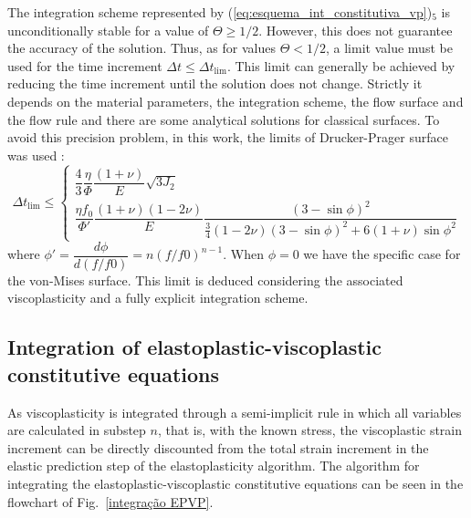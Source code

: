 \documentclass[Journal,letterpaper]{ascelike-new}
\begin{document}
The integration scheme represented by (\ref{eq:esquema_int_constitutiva_vp})$_5$ is unconditionally stable for a value of $\Theta \geq 1/2$. However, this does not guarantee the accuracy of the solution. Thus, as for values $\Theta < 1/2$, a limit value must be used for the time increment $\Delta t \leq \Delta t_{\text{lim}}$. This limit can generally be achieved by reducing the time increment until the solution does not change. Strictly it depends on the material parameters, the integration scheme, the flow surface and the flow rule and there are some analytical solutions for classical surfaces. To avoid this precision problem, in this work, the limits of Drucker-Prager surface was used \cite{cormeau1975}:
\begin{equation}
	\label{eq:deltatmin_dp}
	\Delta t_{\text{lim}} \leq \left\{ 
	\begin{array}{lcl} 
		\dfrac{4}{3}\dfrac{\eta}{\Phi}\dfrac{(1+\nu)}{E} {\sqrt{3J_2}} \\
		\dfrac{\eta f_0}{\Phi'}\dfrac{(1+\nu)(1-2\nu)}{E}\dfrac{(3-\sin{\phi})^2}{\frac{3}{4}(1-2\nu)(3-\sin{\phi})^2 + 6(1+\nu)\sin{\phi}^2}
	\end{array} \right.
\end{equation}
where $\phi'= \dfrac{d \phi}{d(f/f0)} = n(f/f0)^{n-1}$. When $\phi = 0$ we have the specific case for the von-Mises surface. This limit is deduced considering the associated viscoplasticity and a fully explicit integration scheme. 

\subsection{Integration of elastoplastic-viscoplastic constitutive equations}

As viscoplasticity is integrated through a semi-implicit rule in which all variables are calculated in substep $n$, that is, with the known stress, the viscoplastic strain increment can be directly discounted from the total strain increment in the elastic prediction step of the elastoplasticity algorithm. The algorithm for integrating the elastoplastic-viscoplastic constitutive equations can be seen in the flowchart of Fig.~\ref{integração EPVP}.
\end{document}
